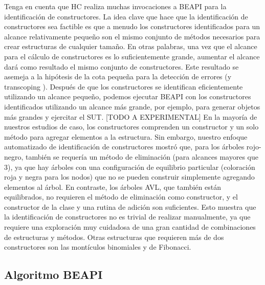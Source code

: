 Tenga en cuenta que HC realiza muchas invocaciones a \textsf{BEAPI} para la identificación de constructores. La idea clave que hace que la identificación de constructores sea factible es que a menudo los constructores identificados para un alcance relativamente pequeño son el mismo conjunto de métodos necesarios para crear estructuras de cualquier tamaño. En otras palabras, una vez que el alcance para el cálculo de constructores es lo suficientemente grande, aumentar el alcance dará como resultado el mismo conjunto de constructores. Este resultado se asemeja a la hipótesis de la cota pequeña para la detección de errores \cite{Andoni02} (y transcoping \cite{Rosner13}). Después de que los constructores se identifican eficientemente utilizando un alcance pequeño, podemos ejecutar \textsf{BEAPI} con los constructores identificados utilizando un alcance más grande, por ejemplo, para generar objetos más grandes y ejercitar el SUT. 
[TODO A EXPERIMENTAL]
En la mayoría de nuestros estudios de caso, los constructores comprenden un constructor y un solo método para agregar elementos a la estructura. Sin embargo, nuestro enfoque automatizado de identificación de constructores mostró que, para los árboles rojo-negro, también se requería un método de eliminación (para alcances mayores que 3), ya que hay árboles con una configuración de equilibrio particular (coloración roja y negra para los nodos) que no se pueden construir simplemente agregando elementos al árbol. En contraste, los árboles AVL, que también están equilibrados, no requieren el método de eliminación como constructor, y el constructor de la clase y una rutina de adición son suficientes. Esto muestra que la identificación de constructores no es trivial de realizar manualmente, ya que requiere una exploración muy cuidadosa de una gran cantidad de combinaciones de estructuras y métodos. Otras estructuras que requieren más de dos constructores son las montículos binomiales y de Fibonacci.


\subsection{Algoritmo BEAPI}

